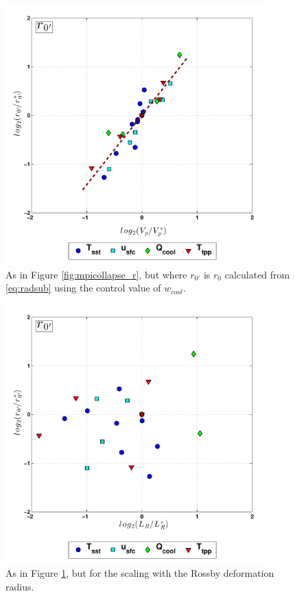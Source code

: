 \documentclass[12pt]{article}
\begin{document}
\begin{figure}[h!]
\centering
  \noindent\includegraphics[width=10cm,height=10cm]{FIGURES_TC_RCE_equilibrium_v2.0/Fig5_MPI_collapse_r0ctrlwcool.pdf}
\caption{As in Figure \ref{fig:mpicollapse_r}, but where $r_{0'}$ is $r_0$ calculated from \eqref{eq:radsub} using the control value of $w_{cool}$.}
\label{fig:mpicollapse_r0ctrlwcool}
\end{figure}

\begin{figure}[h!]
\centering
  \noindent\includegraphics[width=10cm,height=10cm]{FIGURES_TC_RCE_equilibrium_v2.0/Fig5half_LR_nocollapse_r0ctrlwcool.pdf}
\caption{As in Figure \ref{fig:mpicollapse_r0ctrlwcool}, but for the scaling with the Rossby deformation radius.}
\label{fig:LRcollapse_r0ctrlwcool}
\end{figure}
\end{document}
